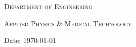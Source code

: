 \begin{titlepage}
{\begin{flushleft}
	\end{flushleft}
}{%
	\textsc{\Large Department of Engineering}\par\vspace{0.5cm}\par
	\textsc{\large Applied Physics \& Medical Technology}\par\vspace{0.5cm}
	\vfill
	\begin{flushleft}
		Date:\hspace{0.4cm} {\large\today}
	\end{flushleft}
}
\end{titlepage}